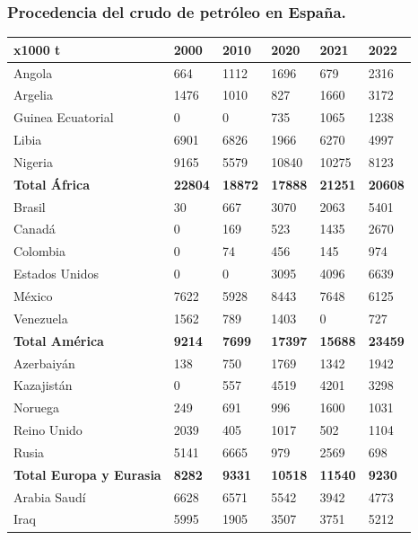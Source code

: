 		\subsubsection{Procedencia del crudo de petróleo en España.}
			\begin{table}[H]
				\centering
				\begin{tabular}{llllll}
					\textbf{x1000 t}	&	\textbf{2000}	&	\textbf{2010}	&	\textbf{2020}	&	\textbf{2021}	&	\textbf{2022}	\\
					\hline
					Angola	&	664	&	1112	&	1696	&	679	&	2316	\\
					Argelia	&	1476	&	1010	&	827	&	1660	&	3172	\\
					Guinea Ecuatorial	&	0	&	0	&	735	&	1065	&	1238	\\
					Libia	&	6901	&	6826	&	1966	&	6270	&	4997	\\
					Nigeria	&	9165	&	5579	&	10840	&	10275	&	8123	\\
					\textbf{Total África}	&	\textbf{22804}	&	\textbf{18872}	&	\textbf{17888}	&	\textbf{21251}	&	\textbf{20608}	\\
					\hline
					Brasil	&	30	&	667	&	3070	&	2063	&	5401	\\
					Canadá	&	0	&	169	&	523	&	1435	&	2670	\\
					Colombia	&	0	&	74	&	456	&	145	&	974	\\
					Estados Unidos	&	0	&	0	&	3095	&	4096	&	6639	\\
					México	&	7622	&	5928	&	8443	&	7648	&	6125	\\
					Venezuela	&	1562	&	789	&	1403	&	0	&	727	\\
					\textbf{Total América}	&	\textbf{9214}	&	\textbf{7699}	&	\textbf{17397}	&	\textbf{15688}	&	\textbf{23459}	\\
					\hline
					Azerbaiyán	&	138	&	750	&	1769	&	1342	&	1942	\\
					Kazajistán	&	0	&	557	&	4519	&	4201	&	3298	\\
					Noruega	&	249	&	691	&	996	&	1600	&	1031	\\
					Reino Unido	&	2039	&	405	&	1017	&	502	&	1104	\\
					Rusia	&	5141	&	6665	&	979	&	2569	&	698	\\
					\textbf{Total Europa y Eurasia}	&	\textbf{8282}	&	\textbf{9331}	&	\textbf{10518}	&	\textbf{11540}	&	\textbf{9230}	\\
					\hline
					Arabia Saudí	&	6628	&	6571	&	5542	&	3942	&	4773	\\
					Iraq	&	5995	&	1905	&	3507	&	3751	&	5212	\\

\end{tabular}
\end{table}
